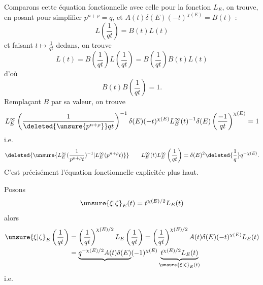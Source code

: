 Comparons cette équation fonctionnelle avec celle pour la fonction $L_E$, on trouve, en  posant pour simplifier $p^{n+\rho}=q$, et $A(t)\delta(E)(-t)^{\chi(E)}=B(t)$ :
\[
L\left(\frac1{qt}\right)=B(t)L(t)
\]
et faisant $t\mapsto\frac1{qt}$ dedans, on trouve
\[
L(t)=B\left(\frac1{qt}\right)L\left(\frac1{qt}\right)=B\left(\frac1{qt}\right)B(t)L(t)
\]
d'où
\[
B(t)B\left(\frac1{qt}\right)=1.
\]
Remplaçant $B$ par sa valeur, on trouve
\[
L_E^\infty\left(\frac1{\deleted{\unsure{p^{n+\rho}}}qt}\right)^{-1}\delta(E)(-t)^{\chi(E)}L_E^\infty(t)^{-1}\delta(E)\left(\frac{-1}{qt}\right)^{\chi(E)}=1
\]
i.e.
\[
\deleted{\unsure{L_E^\infty(\frac1{p^{n+\rho}t})^{-1}|L_E^\infty(p^{n+\rho}t)}}
\qquad L_E^\infty(t)L_E^\infty\left(\frac1{qt}\right)=\delta(E)^2\deleted{\frac1q}q^{-\chi(E)}.
\]
C'est précisément l'équation fonctionnelle explicitée plus haut.

Posons
\[
\unsure{\xi|\zeta}_E(t)=t^{\chi(E)/2}L_E(t)
\]
alors
\[
\begin{aligned}
\unsure{\xi|\zeta}_E\left(\frac1{qt}\right)&=\left(\frac1{qt}\right)^{\chi(E)/2}L_E\left(\frac1{qt}\right)=\left(\frac1{qt}\right)^{\chi(E)/2}A(t)\delta(E)(-t)^{\chi(E)}L_E(t)\\
&=\underbrace{q^{-\chi(E)/2}A(t)\delta(E)}(-1)^{\chi(E)}\underbrace{t^{\chi(E)/2}L_E(t)}_{\unsure{\xi|\zeta}_E(t)}
\end{aligned}
\]
i.e.
